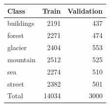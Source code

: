 \begin{tabular}{lrr}
\toprule
Class & Train & Validation \\
\midrule
buildings & 2191 & 437 \\
forest & 2271 & 474 \\
glacier & 2404 & 553 \\
mountain & 2512 & 525 \\
sea & 2274 & 510 \\
street & 2382 & 501 \\
\midrule
Total & 14034 & 3000 \\
\bottomrule
\end{tabular}
